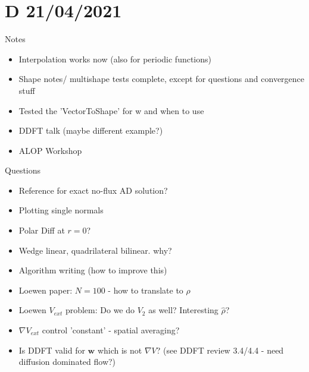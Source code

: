 \documentclass[11pt, a4paper]{article}
\theoremstyle{definition}
\newcommand{\w}{\mathbf{w}}
\newcommand{\hr}{\widehat \rho}
\begin{document}
	\section*{D 21/04/2021}
Notes	
	\begin{itemize}
		\item Interpolation works now (also for periodic functions)
		\item Shape notes/ multishape tests complete, except for questions and convergence stuff
		\item Tested the 'VectorToShape' for w and when to use
		\item DDFT talk (maybe different example?)
		\item ALOP Workshop
	\end{itemize}
Questions
	\begin{itemize}
		\item Reference for exact no-flux AD solution?
		\item Plotting single normals
		\item Polar Diff at $r=0$?
		\item Wedge linear, quadrilateral bilinear. why?
		\item Algorithm writing (how to improve this)
		\item Loewen paper: $N = 100$ -  how to translate to $\rho$
		\item Loewen $V_{ext}$ problem: Do we do $V_2$ as well? Interesting $\hr$? 
		\item $\nabla V_{ext}$ control 'constant' -  spatial averaging?
		\item Is DDFT valid for $\w$ which is not $\nabla V$? (see DDFT review 3.4/4.4 - need diffusion dominated flow?)
	\end{itemize}
\end{document}
